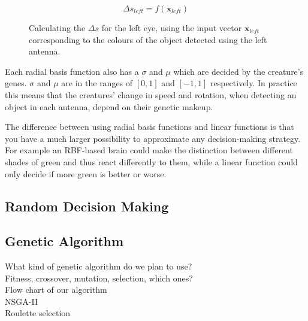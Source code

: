 \documentclass[a4paper,11pt]{kth-mag}
\begin{document}
\begin{figure}
\begin{equation}
\Delta s _{left} = f(\mathbf{x} _{left})
\end{equation}
\caption{Calculating the $\Delta s$ for the left eye, using the input vector $\mathbf{x} _{left}$ corresponding to the colours of the object detected using the left antenna.\label{RBF_decide}}
\end{figure}

Each radial basis function also has a $\sigma$ and $\mu$ which are decided by the creature's genes. $\sigma$ and $\mu$ are in the ranges of $[0,1]$ and $[-1,1]$ respectively. In practice this means that the creatures' change in speed and rotation, when detecting an object in each antenna, depend on their genetic makeup.

The difference between using radial basis functions and linear functions is that you have a much larger possibility to approximate any decision-making strategy. For example an RBF-based brain could make the distinction between different shades of green and thus react differently to them, while a linear function could only decide if more green is better or worse.
\subsection{Random Decision Making}
\subsection{Genetic Algorithm}
What kind of genetic algorithm do we plan to use?\\
Fitness, crossover, mutation, selection, which ones?\\
Flow chart of our algorithm\\
NSGA-II\\
Roulette selection\\
\end{document}
